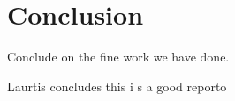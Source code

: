 \section{Conclusion}
Conclude on the fine work we have done.

Laurtis concludes this i s a good reporto
